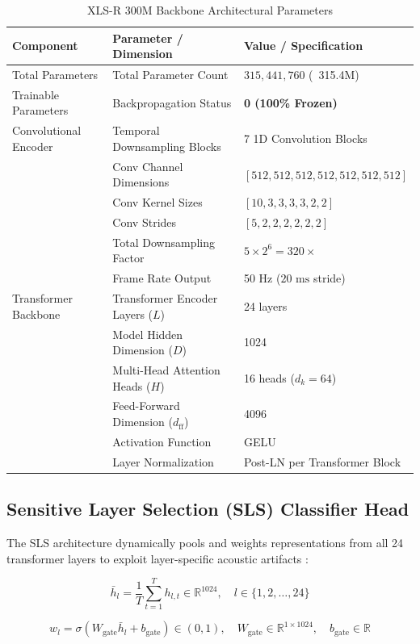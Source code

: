 \documentclass[11pt,a4paper]{article}
\begin{document}
\begin{table}[h!]
\centering
\small
\caption{XLS-R 300M Backbone Architectural Parameters}
\label{tab:backbone_params}
\begin{tabular}{lll}
\toprule
\textbf{Component} & \textbf{Parameter / Dimension} & \textbf{Value / Specification} \\
\midrule
Total Parameters & Total Parameter Count & $315,441,760$ (~315.4M) \\
Trainable Parameters & Backpropagation Status & \textbf{0 (100\% Frozen)} \\
Convolutional Encoder & Temporal Downsampling Blocks & 7 1D Convolution Blocks \\
& Conv Channel Dimensions & $[512, 512, 512, 512, 512, 512, 512]$ \\
& Conv Kernel Sizes & $[10, 3, 3, 3, 3, 2, 2]$ \\
& Conv Strides & $[5, 2, 2, 2, 2, 2, 2]$ \\
& Total Downsampling Factor & $5 \times 2^6 = 320\times$ \\
& Frame Rate Output & 50 Hz ($20\text{ ms}$ stride) \\
Transformer Backbone & Transformer Encoder Layers ($L$) & 24 layers \\
& Model Hidden Dimension ($D$) & 1024 \\
& Multi-Head Attention Heads ($H$) & 16 heads ($d_k = 64$) \\
& Feed-Forward Dimension ($d_{\text{ff}}$) & 4096 \\
& Activation Function & GELU \\
& Layer Normalization & Post-LN per Transformer Block \\
\bottomrule
\end{tabular}
\end{table}

\subsection{Sensitive Layer Selection (SLS) Classifier Head}
The SLS architecture dynamically pools and weights representations from all 24 transformer layers to exploit layer-specific acoustic artifacts \cite{zhang2024sensitive}:

\begin{equation}
\bar{h}_l = \frac{1}{T} \sum_{t=1}^T h_{l,t} \in \mathbb{R}^{1024}, \quad l \in \{1, 2, \dots, 24\}
\end{equation}

\begin{equation}
w_l = \sigma(W_{\text{gate}} \bar{h}_l + b_{\text{gate}}) \in (0, 1), \quad W_{\text{gate}} \in \mathbb{R}^{1 \times 1024}, \quad b_{\text{gate}} \in \mathbb{R}
\end{equation}
\end{document}

